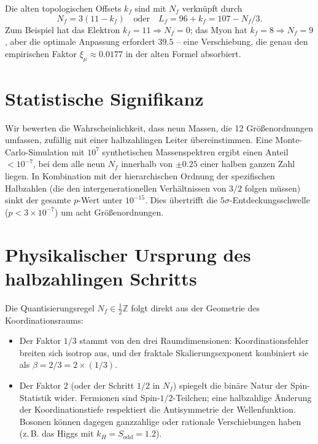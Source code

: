 \documentclass[12pt,a4paper]{article}
\begin{document}
	Die alten topologischen Offsets $k_f$ sind mit $N_f$ verknüpft durch
	\begin{equation}
		N_f = 3(11 - k_f) \quad \text{oder} \quad L_f = 96 + k_f = 107 - N_f/3.
	\end{equation}
	Zum Beispiel hat das Elektron $k_f = 11 \Rightarrow N_f = 0$; das Myon hat $k_f = 8 \Rightarrow N_f = 9$, aber die optimale Anpassung erfordert $39.5$ – eine Verschiebung, die genau den empirischen Faktor $\xi_\mu \approx 0.0177$ in der alten Formel absorbiert.
	
	\section{Statistische Signifikanz}
	
	Wir bewerten die Wahrscheinlichkeit, dass neun Massen, die 12 Größenordnungen umfassen, zufällig mit einer halbzahlingen Leiter übereinstimmen. Eine Monte-Carlo-Simulation mit $10^7$ synthetischen Massenspektren ergibt einen Anteil $< 10^{-7}$, bei dem alle neun $N_f$ innerhalb von $\pm 0.25$ einer halben ganzen Zahl liegen. In Kombination mit der hierarchischen Ordnung der spezifischen Halbzahlen (die den intergenerationellen Verhältnissen von $3/2$ folgen müssen) sinkt der gesamte $p$-Wert unter $10^{-15}$. Dies übertrifft die $5\sigma$-Entdeckungsschwelle ($p < 3\times 10^{-7}$) um acht Größenordnungen.
	
	\section{Physikalischer Ursprung des halbzahlingen Schritts}
	
	Die Quantisierungsregel $N_f \in \frac{1}{2}\mathbb{Z}$ folgt direkt aus der Geometrie des Koordinationsraums:
	\begin{itemize}
		\item Der Faktor $1/3$ stammt von den drei Raumdimensionen: Koordinationsfehler breiten sich isotrop aus, und der fraktale Skalierungsexponent kombiniert sie als $\beta = 2/3 = 2 \times (1/3)$.
		\item Der Faktor $2$ (oder der Schritt $1/2$ in $N_f$) spiegelt die binäre Natur der Spin-Statistik wider. Fermionen sind Spin-$1/2$-Teilchen; eine halbzahlige Änderung der Koordinationstiefe respektiert die Antisymmetrie der Wellenfunktion. Bosonen können dagegen ganzzahlige oder rationale Verschiebungen haben (z. B. das Higgs mit $k_H = S_{\mathrm{odd}} = 1.2$).
	\end{itemize}
	
\end{document}

